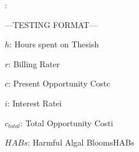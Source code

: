 {}


\fudgenotation {}: {}{}

---TESTING FORMAT---

\addnotation $h$: {Hours spent on Thesis}{h}

\addnotation $r$: {Billing Rate}{r}

\addnotation $c$: {Present Opportunity Cost}{c}

\addnotation $i$: {Interest Rate}{i}

\addnotation $c_{total}$: {Total Opportunity Cost}{i}

\addnotation $HABs$: {Harmful Algal Blooms}{HABs}
